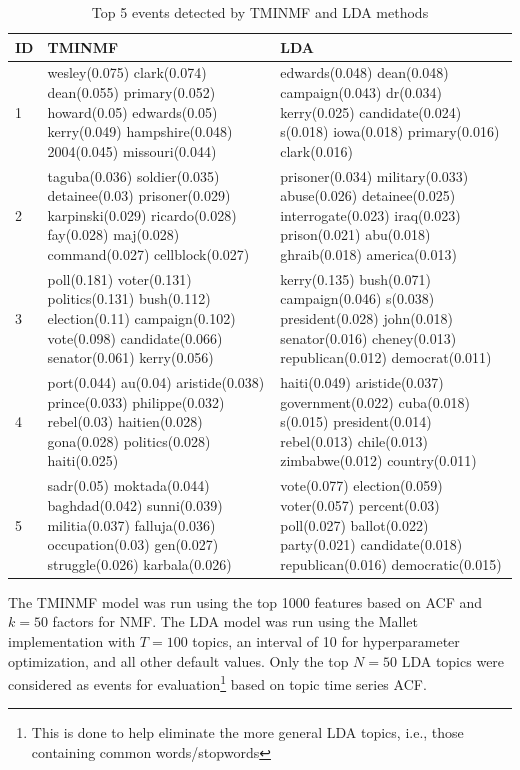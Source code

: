 \documentclass{sig-alternate}
\begin{document}
\begin{table}
\scriptsize
\begin{tabular}{| p{0.2cm} | p{3.5cm} | p{3.5cm} | } \hline
{\bf ID } & {\bf TMINMF} & {\bf LDA } \\ \hline
1 & wesley(0.075) clark(0.074) dean(0.055) primary(0.052) howard(0.05) edwards(0.05) kerry(0.049) hampshire(0.048) 2004(0.045) missouri(0.044) & 
edwards(0.048) dean(0.048) campaign(0.043) dr(0.034) kerry(0.025) candidate(0.024) s(0.018) iowa(0.018) primary(0.016) clark(0.016) \\ \hline
2 & taguba(0.036) soldier(0.035) detainee(0.03) prisoner(0.029) karpinski(0.029) ricardo(0.028) fay(0.028) maj(0.028) command(0.027) cellblock(0.027) &
prisoner(0.034) military(0.033) abuse(0.026) detainee(0.025) interrogate(0.023) iraq(0.023) prison(0.021) abu(0.018) ghraib(0.018) america(0.013) \\ \hline
3 & poll(0.181) voter(0.131) politics(0.131) bush(0.112) election(0.11) campaign(0.102) vote(0.098) candidate(0.066) senator(0.061) kerry(0.056) &
kerry(0.135) bush(0.071) campaign(0.046) s(0.038) president(0.028) john(0.018) senator(0.016) cheney(0.013) republican(0.012) democrat(0.011) \\ \hline
4 & port(0.044) au(0.04) aristide(0.038) prince(0.033) philippe(0.032) rebel(0.03) haitien(0.028) gona(0.028) politics(0.028) haiti(0.025) &
haiti(0.049) aristide(0.037) government(0.022) cuba(0.018) s(0.015) president(0.014) rebel(0.013) chile(0.013) zimbabwe(0.012) country(0.011) \\ \hline
5 & sadr(0.05) moktada(0.044) baghdad(0.042) sunni(0.039) militia(0.037) falluja(0.036) occupation(0.03) gen(0.027) struggle(0.026) karbala(0.026) &
vote(0.077) election(0.059) voter(0.057) percent(0.03) poll(0.027) ballot(0.022) party(0.021) candidate(0.018) republican(0.016) democratic(0.015) \\ \hline
\end{tabular}
\caption{Top 5 events detected by TMINMF and LDA methods}
\label{table.top5}
\end{table}




The TMINMF model was run using the top 1000 features based on ACF and $k=50$ factors for NMF. The LDA model was run using the Mallet implementation with $T=100$ topics, an interval of 10 for hyperparameter optimization, and all other default values. Only the top $N=50$ LDA topics were considered as events for evaluation\footnote{This is done to help eliminate the more general LDA topics, i.e., those containing common words/stopwords} based on topic time series ACF.
\end{document}

